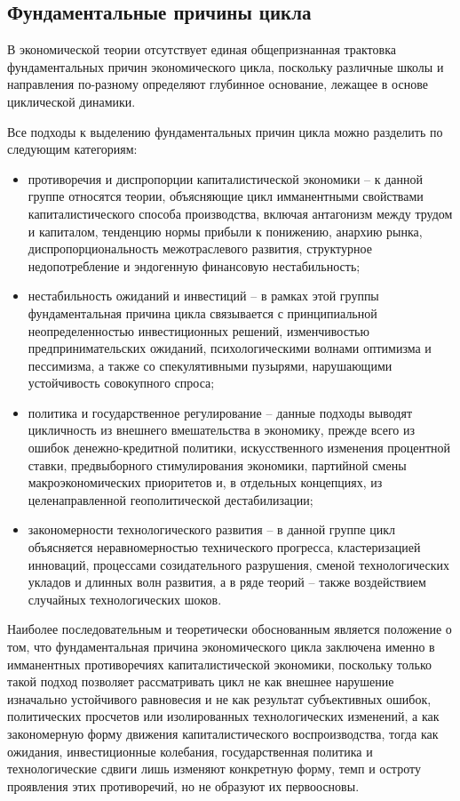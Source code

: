 \subsection{Фундаментальные причины цикла} %
В экономической теории отсутствует единая общепризнанная трактовка фундаментальных причин экономического цикла, поскольку различные школы и направления по-разному определяют глубинное основание, лежащее в основе циклической динамики.

Все подходы к выделению фундаментальных причин цикла можно разделить по следующим категориям:
\begin{itemize}
    \item противоречия и диспропорции капиталистической экономики – к данной группе относятся теории, объясняющие цикл имманентными свойствами капиталистического способа производства, включая антагонизм между трудом и капиталом, тенденцию нормы прибыли к понижению, анархию рынка, диспропорциональность межотраслевого развития, структурное недопотребление и эндогенную финансовую нестабильность;
    \item нестабильность ожиданий и инвестиций – в рамках этой группы фундаментальная причина цикла связывается с принципиальной неопределенностью инвестиционных решений, изменчивостью предпринимательских ожиданий, психологическими волнами оптимизма и пессимизма, а также со спекулятивными пузырями, нарушающими устойчивость совокупного спроса;
    \item политика и государственное регулирование – данные подходы выводят цикличность из внешнего вмешательства в экономику, прежде всего из ошибок денежно-кредитной политики, искусственного изменения процентной ставки, предвыборного стимулирования экономики, партийной смены макроэкономических приоритетов и, в отдельных концепциях, из целенаправленной геополитической дестабилизации;
    \item закономерности технологического развития – в данной группе цикл объясняется неравномерностью технического прогресса, кластеризацией инноваций, процессами созидательного разрушения, сменой технологических укладов и длинных волн развития, а в ряде теорий – также воздействием случайных технологических шоков.
\end{itemize}

Наиболее последовательным и теоретически обоснованным является положение о том, что фундаментальная причина экономического цикла заключена именно в имманентных противоречиях капиталистической экономики, поскольку только такой подход позволяет рассматривать цикл не как внешнее нарушение изначально устойчивого равновесия и не как результат субъективных ошибок, политических просчетов или изолированных технологических изменений, а как закономерную форму движения капиталистического воспроизводства, тогда как ожидания, инвестиционные колебания, государственная политика и технологические сдвиги лишь изменяют конкретную форму, темп и остроту проявления этих противоречий, но не образуют их первоосновы.

